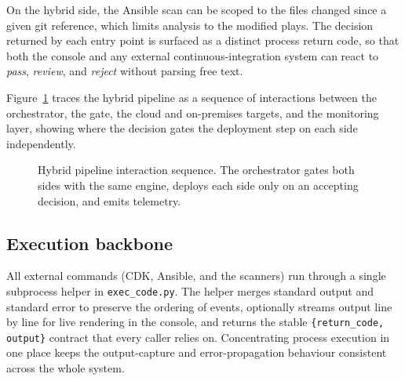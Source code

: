 On the hybrid side, the Ansible scan can be scoped to the files changed since a given git
reference, which limits analysis to the modified plays. The decision returned by each
entry point is surfaced as a distinct process return code, so that both the console and
any external continuous-integration system can react to \emph{pass}, \emph{review}, and
\emph{reject} without parsing free text.

Figure~\ref{fig:impl-sequence} traces the hybrid pipeline as a sequence of interactions
between the orchestrator, the gate, the cloud and on-premises targets, and the monitoring
layer, showing where the decision gates the deployment step on each side independently.

\begin{figure}[ht]
\centering
{}
\caption{Hybrid pipeline interaction sequence. The orchestrator gates both sides with the
same engine, deploys each side only on an accepting decision, and emits telemetry.}
\label{fig:impl-sequence}
\end{figure}

\subsection{Execution backbone}
\label{subsec:impl-exec}

All external commands (CDK, Ansible, and the scanners) run through a single subprocess
helper in \texttt{exec\_code.py}. The helper merges standard output and standard error to
preserve the ordering of events, optionally streams output line by line for live
rendering in the console, and returns the stable \texttt{\{return\_code, output\}}
contract that every caller relies on. Concentrating process execution in one place keeps
the output-capture and error-propagation behaviour consistent across the whole system.

